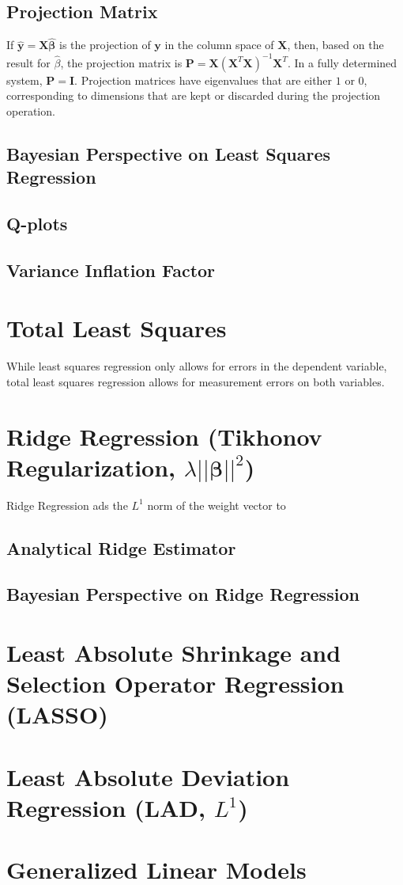 \subsection{Projection Matrix}

If $\mathbf{\hat{y}}=\mathbf{X}\mathbf{\hat{\beta}}$ is the projection of $\mathbf{y}$ in the column space of $\mathbf{X}$, then, based on the result for $\hat{\beta}$, the projection matrix is $\mathbf{P} = \mathbf{X}\left(\mathbf{X}^T\mathbf{X}\right)^{-1}\mathbf{X}^T$. In a fully determined system, $\mathbf{P}=\mathbf{I}$. Projection matrices have eigenvalues that are either $1$ or $0$, corresponding to dimensions that are kept or discarded during the projection operation.


\subsection{Bayesian Perspective on Least Squares Regression}




\subsection{Q-plots}
\subsection{Variance Inflation Factor}

\section{Total Least Squares}
While least squares regression only allows for errors in the dependent variable, total least squares regression allows for measurement errors on both variables.

\section{Ridge Regression (Tikhonov Regularization, $\lambda ||\mathbf{\beta}||^2$)}
Ridge Regression ads the $L^1$ norm of the weight vector to 

\subsection{Analytical Ridge Estimator}
\subsection{Bayesian Perspective on Ridge Regression}

\section{Least Absolute Shrinkage and Selection Operator Regression (LASSO)}


\section{Least Absolute Deviation Regression (LAD, $L^1$)}


\section{Generalized Linear Models}


\chapauthor{}

